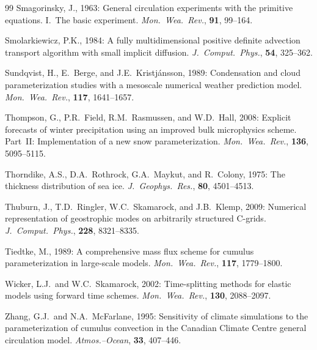 \documentclass[11pt,twoside]{report}
\begin{document}
\begin{thebibliography}{99}
Smagorinsky, J., 1963:
General circulation experiments with the primitive equations. I.\ The basic
experiment.
\textit{Mon.\ Wea.\ Rev.}, \textbf{91}, 99--164.

Smolarkiewicz, P.K., 1984:
A fully multidimensional positive definite advection transport algorithm
with small implicit diffusion.
\textit{J.\ Comput.\ Phys.}, \textbf{54}, 325--362.

Sundqvist, H., E.~Berge, and J.E.~Kristj\'ansson, 1989:
Condensation and cloud parameterization studies with a mesoscale numerical
weather prediction model.
\textit{Mon.\ Wea.\ Rev.}, \textbf{117}, 1641--1657.

Thompson, G., P.R.~Field, R.M.~Rasmussen, and W.D.~Hall, 2008:
Explicit forecasts of winter precipitation using an improved bulk
microphysics scheme. Part~II: Implementation of a new snow parameterization.
\textit{Mon.\ Wea.\ Rev.}, \textbf{136}, 5095--5115.

Thorndike, A.S., D.A.~Rothrock, G.A.~Maykut, and R.~Colony, 1975:
The thickness distribution of sea ice.
\textit{J.\ Geophys.\ Res.}, \textbf{80}, 4501--4513.

Thuburn, J., T.D.~Ringler, W.C.~Skamarock, and J.B.~Klemp, 2009:
Numerical representation of geostrophic modes on arbitrarily structured
C-grids.
\textit{J.\ Comput.\ Phys.}, \textbf{228}, 8321--8335.

Tiedtke, M., 1989:
A comprehensive mass flux scheme for cumulus parameterization in large-scale
models.
\textit{Mon.\ Wea.\ Rev.}, \textbf{117}, 1779--1800.

Wicker, L.J.\ and W.C.~Skamarock, 2002:
Time-splitting methods for elastic models using forward time schemes.
\textit{Mon.\ Wea.\ Rev.}, \textbf{130}, 2088--2097.

Zhang, G.J.\ and N.A.~McFarlane, 1995:
Sensitivity of climate simulations to the parameterization of cumulus
convection in the Canadian Climate Centre general circulation model.
\textit{Atmos.--Ocean}, \textbf{33}, 407--446.



\end{thebibliography}
\end{document}
